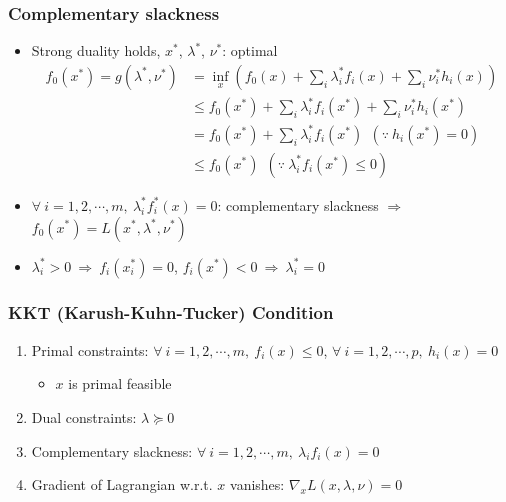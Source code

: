 \subsubsection*{Complementary slackness}
\begin{itemize}
    \item Strong duality holds, $x^\ast$, $\lambda^\ast$, $\nu^\ast$: optimal
    $$ \begin{aligned}
        f_0(x^\ast)=g(\lambda^\ast,\nu^\ast) &= \inf_{x} \left(f_0(x)+\sum_{i}\lambda_i^\ast f_i(x)+\sum_i \nu_i^\ast h_i(x)\right) \\
            &\leq f_0(x^\ast)+\sum_{i}\lambda_i^\ast f_i(x^\ast)+\sum_i \nu_i^\ast h_i(x^\ast) \\
            &= f_0(x^\ast)+\sum_{i}\lambda_i^\ast f_i(x^\ast)~~(\because~h_i(x^\ast)=0) \\
            &\leq f_0(x^\ast)~~(\because~\lambda_i^\ast f_i(x^\ast)\leq 0)
    \end{aligned} $$
    \item $\forall~i=1,2,\cdots,m,~\lambda_i^\ast f_i^\ast(x) = 0$: complementary slackness $\Rightarrow$ $f_0(x^\ast) = L(x^\ast,\lambda^\ast,\nu^\ast)$
    \item $\lambda_i^\ast>0~\Rightarrow~f_i(x_i^\ast)=0$, $f_i(x^\ast)<0~\Rightarrow~\lambda_i^\ast=0$
\end{itemize}
\newpage

\subsubsection*{KKT (Karush-Kuhn-Tucker) Condition}
\begin{enumerate}
    \item Primal constraints: $\forall~i=1,2,\cdots,m,~f_i(x)\leq 0$, $\forall~i=1,2,\cdots,p,~h_i(x)=0$
    \begin{itemize}
        \item $x$ is primal feasible
    \end{itemize}
    \item Dual constraints: $\lambda\succeq 0$
    \item Complementary slackness: $\forall~i=1,2,\cdots,m,~\lambda_i f_i(x) = 0$
    \item Gradient of Lagrangian w.r.t. $x$ vanishes: $\nabla_x L(x,\lambda,\nu) = 0$
\end{enumerate}

